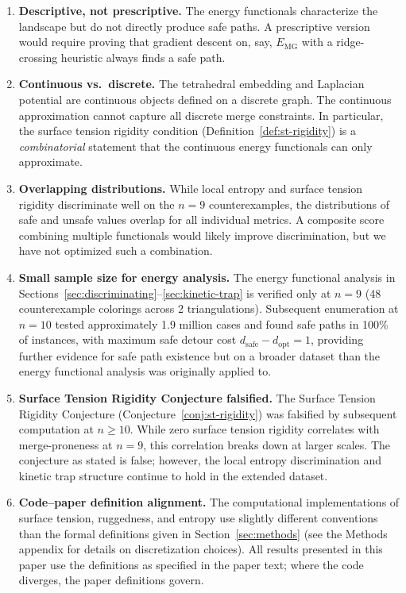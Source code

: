 \begin{enumerate}
  \item \textbf{Descriptive, not prescriptive.} The energy functionals
    characterize the landscape but do not directly produce safe paths.
    A prescriptive version would require proving that gradient descent
    on, say, $E_{\mathrm{MG}}$ with a ridge-crossing heuristic always
    finds a safe path.

  \item \textbf{Continuous vs.\ discrete.} The tetrahedral embedding
    and Laplacian potential are continuous objects defined on a discrete
    graph. The continuous approximation cannot capture all discrete
    merge constraints. In particular, the surface tension rigidity
    condition (Definition~\ref{def:st-rigidity}) is a
    \emph{combinatorial} statement that the continuous energy
    functionals can only approximate.

  \item \textbf{Overlapping distributions.} While local entropy and
    surface tension rigidity discriminate well on the $n = 9$
    counterexamples, the distributions of safe and unsafe values
    overlap for all individual metrics. A composite score combining
    multiple functionals would likely improve discrimination, but we
    have not optimized such a combination.

  \item \textbf{Small sample size for energy analysis.} The energy
    functional analysis in
    Sections~\ref{sec:discriminating}--\ref{sec:kinetic-trap} is
    verified only at $n = 9$ (48 counterexample colorings across 2
    triangulations). Subsequent enumeration at $n = 10$ tested
    approximately 1.9 million cases and found safe paths in 100\% of
    instances, with maximum safe detour cost
    $d_{\text{safe}} - d_{\text{opt}} = 1$, providing further evidence
    for safe path existence but on a broader dataset than the energy
    functional analysis was originally applied to.

  \item \textbf{Surface Tension Rigidity Conjecture falsified.}
    The Surface Tension Rigidity Conjecture
    (Conjecture~\ref{conj:st-rigidity}) was falsified by subsequent
    computation at $n \geq 10$. While zero surface tension rigidity
    correlates with merge-proneness at $n = 9$, this correlation breaks
    down at larger scales. The conjecture as stated is false; however,
    the local entropy discrimination and kinetic trap structure continue
    to hold in the extended dataset.

  \item \textbf{Code--paper definition alignment.} The computational
    implementations of surface tension, ruggedness, and entropy use
    slightly different conventions than the formal definitions given in
    Section~\ref{sec:methods} (see the Methods appendix for details on
    discretization choices). All results presented in this paper use
    the definitions as specified in the paper text; where the code
    diverges, the paper definitions govern.
\end{enumerate}
